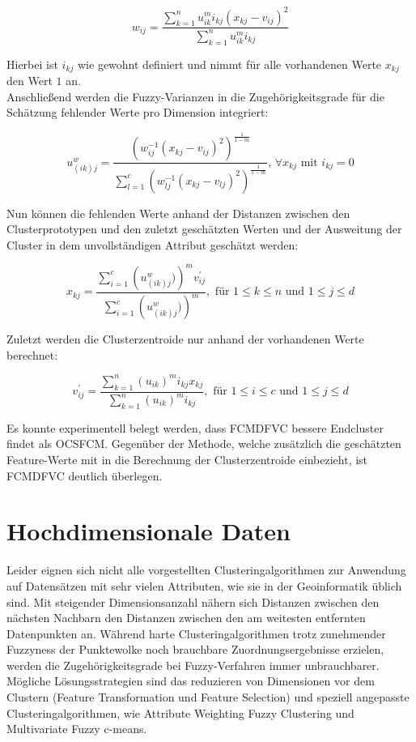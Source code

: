 \documentclass[11pt,ceqn]{book}
\begin{document}
$$w_{ij} = \frac{\sum\limits_{k=1}^n u_{ik}^m i_{kj} (x_{kj}-v_{ij})^2}{\sum\limits_{k=1}^n u_{ik}^m i_{kj}}$$

Hierbei ist $i_{kj}$ wie gewohnt definiert und nimmt für alle vorhandenen Werte $x_{kj}$ den Wert $1$ an.\\

Anschließend werden die Fuzzy-Varianzen in die Zugehörigkeitsgrade für die Schätzung fehlender Werte pro Dimension integriert:

$$u_{(ik)j}^w = \frac{\left(w_{ij}^{-1}(x_{kj}-v_{ij})^2 \right)^{\frac{1}{1-m}}}{\sum\limits_{l=1}^c \left(w_{lj}^{-1}(x_{kj}-v_{lj})^2\right)^{\frac{1}{1-m}}}, \, \forall x_{kj} \text{ mit } i_{kj}=0$$

Nun können die fehlenden Werte anhand der Distanzen zwischen den Clusterprototypen und den zuletzt geschätzten Werten und der Ausweitung der Cluster in dem unvollständigen Attribut geschätzt werden:

$$x_{kj} = \frac{\sum\limits_{i=1}^c \left(u_{(ik)j}^w) \right)^m v_{ij}^{\prime}}{\sum\limits_{i=1}^c \left(u_{(ik)j}^w) \right)^m}, \text{ für } 1\leqslant k \leqslant n \text{ und } 1\leqslant j\leqslant d$$

Zuletzt werden die Clusterzentroide nur anhand der vorhandenen Werte berechnet:

$$v_{ij}^{\prime} = \frac{\sum\limits_{k=1}^n (u_{ik})^m i_{kj} x_{kj}}{\sum\limits_{k=1}^n (u_{ik})^m i_{kj}},\text{ für }  1\leqslant i \leqslant c \text{ und } 1\leqslant j \leqslant d$$

Es konnte experimentell belegt werden, dass FCMDFVC bessere Endcluster findet als OCSFCM. Gegenüber der Methode, welche zusätzlich die geschätzten Feature-Werte mit in die Berechnung der Clusterzentroide einbezieht, ist FCMDFVC deutlich überlegen.

\section{Hochdimensionale Daten}
Leider eignen sich nicht alle vorgestellten Clusteringalgorithmen zur Anwendung auf Datensätzen mit sehr vielen Attributen, wie sie in der Geoinformatik üblich sind. Mit steigender Dimensionsanzahl nähern sich Distanzen zwischen den nächsten Nachbarn den Distanzen zwischen den am weitesten entfernten Datenpunkten an. Während harte Clusteringalgorithmen trotz zunehmender Fuzzyness der Punktewolke noch brauchbare Zuordnungsergebnisse erzielen, werden die Zugehörigkeitsgrade bei Fuzzy-Verfahren immer unbrauchbarer.
Mögliche Lösungsstrategien sind das reduzieren von Dimensionen vor dem Clustern (Feature Transformation und Feature Selection) und speziell angepasste Clusteringalgorithmen, wie Attribute Weighting Fuzzy Clustering und Multivariate Fuzzy c-means.
\\~\\
\end{document}
